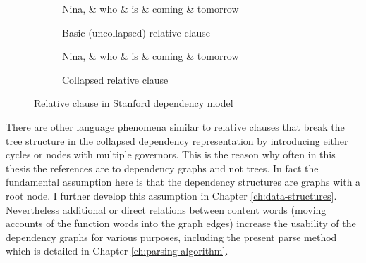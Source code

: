     \begin{figure}[!ht]
    	\centering
    	\begin{subfigure}{.45\textwidth}
            \begin{dependency}
                \begin{deptext}[]
                    Nina, \& who \& is \& coming \& tomorrow\\ %
                \end{deptext}
            \end{dependency}
            \caption{Basic (uncollapsed) relative clause}
            \label{fig:rel-transf1}
        \end{subfigure}
    	\quad
        \begin{subfigure}{.45\textwidth}
        \centering
        \begin{dependency}
            \begin{deptext}[]
                Nina, \& who \& is \& coming \& tomorrow\\ %
            \end{deptext}
        \end{dependency}
        \caption{Collapsed relative clause}
        \label{fig:rel-transf2}
    \end{subfigure}
        \caption{Relative clause in Stanford dependency model}
        \label{fig:rel-transf}
    \end{figure}

    There are other language phenomena similar to relative clauses that break the tree structure in the collapsed dependency representation by introducing either cycles or nodes with multiple governors. This is the reason why often in this thesis the references are to dependency graphs and not trees. In fact the fundamental assumption here is that the dependency structures are graphs with a root node. I further develop this assumption in Chapter \ref{ch:data-structures}. Nevertheless additional or direct relations between content words (moving accounts of the function words into the graph edges) increase the usability of the dependency graphs for various purposes, including the present parse method which is detailed in Chapter \ref{ch:parsing-algorithm}. 


